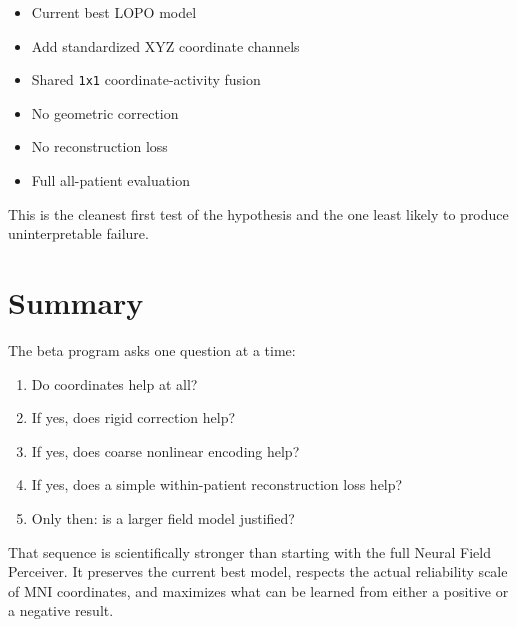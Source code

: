 \documentclass[
]{article}
\providecommand{\tightlist}{%
  \setlength{\itemsep}{0pt}\setlength{\parskip}{0pt}}
\begin{document}
\begin{itemize}
\tightlist
\item
  Current best LOPO model
\item
  Add standardized XYZ coordinate channels
\item
  Shared \texttt{1x1} coordinate-activity fusion
\item
  No geometric correction
\item
  No reconstruction loss
\item
  Full all-patient evaluation
\end{itemize}

This is the cleanest first test of the hypothesis and the one least
likely to produce uninterpretable failure.

\section{Summary}\label{summary}

The beta program asks one question at a time:

\begin{enumerate}
\def\labelenumi{\arabic{enumi}.}
\tightlist
\item
  Do coordinates help at all?
\item
  If yes, does rigid correction help?
\item
  If yes, does coarse nonlinear encoding help?
\item
  If yes, does a simple within-patient reconstruction loss help?
\item
  Only then: is a larger field model justified?
\end{enumerate}

That sequence is scientifically stronger than starting with the full
Neural Field Perceiver. It preserves the current best model, respects
the actual reliability scale of MNI coordinates, and maximizes what can
be learned from either a positive or a negative result.
\end{document}
